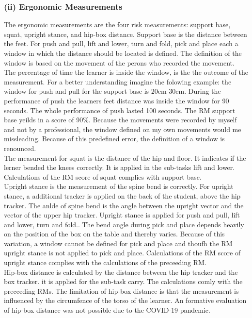 \subsubsection{(ii) Ergonomic Measurements}
The ergonomic measurements are the four risk measurements: support base, squat, upright stance, and hip-box distance. Support base is the distance between the feet. For push and  pull, lift and lower, turn and fold, pick and place each a window in which the distance should be located is defined. The definition of the window is based on the movement of the perons who recorded the movement. The percentage of time the learner is inside the window, is the the outcome of the measurement. For a better understanding imagine the folowing example: the window for push and pull for the support base is 20cm-30cm. During the performance of push the learners feet distance was inside the window for 90 seconds. The whole performance of push lasted 100 seconds. The RM support base yeilds in a score of 90\%. Because the movements were recorded by myself and not by a professional, the window defined on my own movements would me missleading. Because of this predefined error, the definition of a window is renounced.\\
The measurement for squat is the distance of the hip and floor. It indicates if the lerner bended the knees correctly. It is applied in the sub-tasks lift and lower. Calculations of the RM score of squat complies with support base.\\
Upright stance is the measurement of the spine bend is correctly. For upright stance, a additional tracker is applied on the back of the student, above the hip tracker. The anlde of spine bend is the angle between the upright vector and the vector of the upper hip tracker. Upright stance is applied for push and pull, lift and lower, turn and fold.. The bend angle during pick and place depends heavily on the position of the box on the table and thereby varies. Because of this variation, a window cannot be defined for pick and place and thoufh the RM upright stance is not applied to pick and place. Calculations of the RM score of upright stance complies with the calculations of the preceeding RM.\\
Hip-box distance is calculated by the distance between the hip tracker and the box tracker. it is applied for the sub-task carry. The calculations comly with the preceeding RMs. The limitation of hip-box distance is that the measurement is influenced by the circumfence of the torso of the learner. An formative evaluation of hip-box distance was not possible due to the COVID-19 pandemic.

